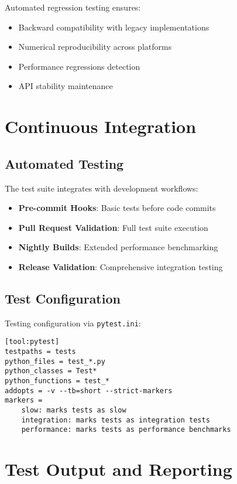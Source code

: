 \documentclass[12pt]{article}
\begin{document}
Automated regression testing ensures:
\begin{itemize}
\item Backward compatibility with legacy implementations
\item Numerical reproducibility across platforms
\item Performance regressions detection
\item API stability maintenance
\end{itemize}

\section{Continuous Integration}

\subsection{Automated Testing}

The test suite integrates with development workflows:
\begin{itemize}
\item \textbf{Pre-commit Hooks}: Basic tests before code commits
\item \textbf{Pull Request Validation}: Full test suite execution
\item \textbf{Nightly Builds}: Extended performance benchmarking
\item \textbf{Release Validation}: Comprehensive integration testing
\end{itemize}

\subsection{Test Configuration}

Testing configuration via \texttt{pytest.ini}:
\begin{lstlisting}[caption=PyTest Configuration]
[tool:pytest]
testpaths = tests
python_files = test_*.py
python_classes = Test*
python_functions = test_*
addopts = -v --tb=short --strict-markers
markers =
    slow: marks tests as slow
    integration: marks tests as integration tests
    performance: marks tests as performance benchmarks
\end{lstlisting}

\section{Test Output and Reporting}
\end{document}
